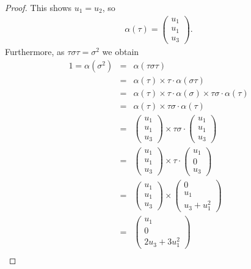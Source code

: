 \begin{proof}
	This shows $u_1 = u_2$, so
	\begin{eqnarray*}
		\alpha(\tau) = \left(\begin{matrix} u_1 \\ u_1 \\ u_3\end{matrix} \right).
	\end{eqnarray*}
	Furthermore, as $\tau\sigma\tau = \sigma^2$ we obtain
	\begin{eqnarray*}
		1 = \alpha(\sigma^2) &=& \alpha(\tau\sigma\tau) \\
		&=& \alpha(\tau) \times \tau\cdot\alpha(\sigma\tau)\\
		&=& \alpha(\tau) \times \tau\cdot\alpha(\sigma) \times \tau\sigma\cdot\alpha(\tau) \\
		&=& \alpha(\tau) \times \tau\sigma\cdot\alpha(\tau) \\
		&=& \left(\begin{matrix} u_1 \\ u_1 \\ u_3\end{matrix} \right) \times
		\tau\sigma\cdot\left(\begin{matrix} u_1 \\ u_1 \\ u_3\end{matrix} \right)\\
		&=& \left(\begin{matrix} u_1 \\ u_1 \\ u_3\end{matrix} \right) \times
		\tau\cdot\left(\begin{matrix} u_1 \\ 0 \\ u_3\end{matrix} \right)\\
		&=& \left(\begin{matrix} u_1 \\ u_1 \\ u_3\end{matrix} \right) \times
		\left(\begin{matrix} 0 \\ u_1 \\ u_3 + u_1^2\end{matrix} \right)\\
		&=& \left(\begin{matrix} u_1 \\ 0 \\ 2u_3 + 3u_1^2\end{matrix} \right)\\

\end{eqnarray*}
\end{proof}
